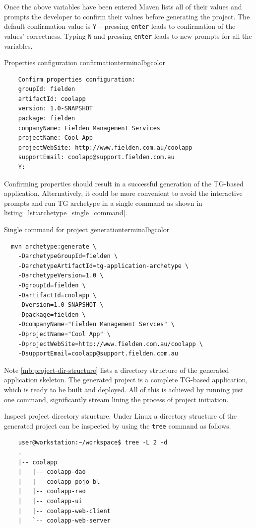   Once the above variables have been entered Maven lists all of their values and prompts the developer to confirm their values before generating the project. 
  The default confirmation value is \texttt{Y} -- pressing \texttt{enter} leads to confirmation of the values' correctness. 
  Typing \texttt{N} and pressing \texttt{enter} leads to new prompts for all the variables.

  
  \begin{code}{Properties configuration confirmation}{\label{lst:properties_confirmation}}{terminalbgcolor}
      \begin{lstlisting}
	Confirm properties configuration:
	groupId: fielden
	artifactId: coolapp
	version: 1.0-SNAPSHOT
	package: fielden
	companyName: Fielden Management Services
	projectName: Cool App
	projectWebSite: http://www.fielden.com.au/coolapp
	supportEmail: coolapp@support.fielden.com.au
	Y:
      \end{lstlisting}
  \end{code}

  Confirming properties should result in a successful generation of the TG-based application.
  Alternatively, it could be more convenient to avoid the interactive prompts and run TG archetype in a single command as shown in listing~\ref{lst:archetype_single_command}.

  \begin{code}{Single command for project generation}{\label{lst:archetype_single_command}}{terminalbgcolor}
      \begin{lstlisting}
  mvn archetype:generate \
	-DarchetypeGroupId=fielden \
	-DarchetypeArtifactId=tg-application-archetype \
	-DarchetypeVersion=1.0 \
	-DgroupId=fielden \
	-DartifactId=coolapp \
	-Dversion=1.0-SNAPSHOT \
	-Dpackage=fielden \
	-DcompanyName="Fielden Management Servces" \
	-DprojectName="Cool App" \
	-DprojectWebSite=http://www.fielden.com.au/coolapp \
	-DsupportEmail=coolapp@support.fielden.com.au
      \end{lstlisting}
  \end{code}

  Note \ref{mb:project-dir-structure} lists a directory structure of the generated application skeleton.
  The generated project is a complete TG-based application, which is ready to be built and deployed.
  All of this is achieved by running just one command, significantly stream lining the process of project initiation.
 
  \begin{notebox}{Inspect project directory structure.}{\label{mb:project-dir-structure}}
      Under Linux a directory structure of the generated project can be inspected by using the \texttt{tree} command as follows.
	
      \begin{verbatim}
	user@workstation:~/workspace$ tree -L 2 -d
	.
	|-- coolapp
	|   |-- coolapp-dao
	|   |-- coolapp-pojo-bl
	|   |-- coolapp-rao
	|   |-- coolapp-ui
	|   |-- coolapp-web-client
	|   `-- coolapp-web-server
      \end{verbatim}
  \end{notebox}


